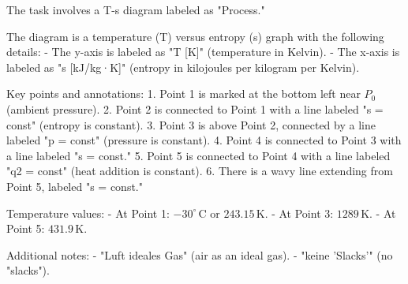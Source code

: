 The task involves a T-s diagram labeled as "Process."  

The diagram is a temperature (T) versus entropy (s) graph with the following details:  
- The y-axis is labeled as "T [K]" (temperature in Kelvin).  
- The x-axis is labeled as "s [kJ/kg·K]" (entropy in kilojoules per kilogram per Kelvin).  

Key points and annotations:  
1. Point 1 is marked at the bottom left near \( P_0 \) (ambient pressure).  
2. Point 2 is connected to Point 1 with a line labeled "s = const" (entropy is constant).  
3. Point 3 is above Point 2, connected by a line labeled "p = const" (pressure is constant).  
4. Point 4 is connected to Point 3 with a line labeled "s = const."  
5. Point 5 is connected to Point 4 with a line labeled "q2 = const" (heat addition is constant).  
6. There is a wavy line extending from Point 5, labeled "s = const."  

Temperature values:  
- At Point 1: \(-30^\circ \, \text{C}\) or \(243.15 \, \text{K}\).  
- At Point 3: \(1289 \, \text{K}\).  
- At Point 5: \(431.9 \, \text{K}\).  

Additional notes:  
- "Luft ideales Gas" (air as an ideal gas).  
- "keine 'Slacks'" (no "slacks").